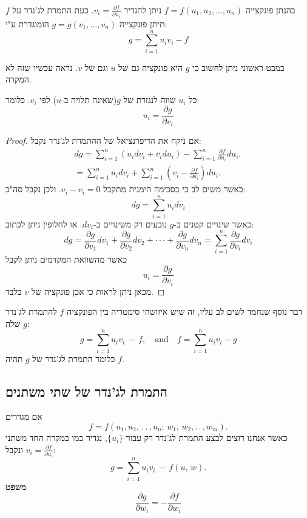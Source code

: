 \documentclass{tstextbook}
\begin{document}
\begin{definition}
בהנתן פונקצייה \(f=f\left( u_{1},u_{2},\dots,u_{n} \right)\) ניתן להגדיר \(v_{i}=\frac{\partial f}{\partial u_{i}}{}\). כעת התמרת לג'נדר על \(f\) תיתן פונקצייה \(g=g\left( v_{1},\dots,v_{n} \right)\) הומוגדרת ע"י:
$$g=\sum_{i=1}^{n}u_{i}v_{i}-f$$

\end{definition}
במבט ראשוני ניתן לחשוב כי \(g\) היא פונקציה גם של \(u\) וגם של \(v\). נראה עכשיו שזה לא המקרה.

\begin{theorem}
כל \(u_i\) שווה לנגזרת של \(g\)(שאינה תלויה ב-\(u\)) לפי \(v_{i}\). כלומר:
 $$u_{i}=\frac{\partial g}{\partial v_{i}}$$

\end{theorem}
\begin{proof}
אם ניקח את הדיפרנציאל של ההתמרת לג'נדר נקבל:
 $$\begin{array}{c}{{d g=\displaystyle\sum_{i=1}^{n}\left(u_{i}d v_{i}+v_{i}d u_{i}\right)-\sum_{i=1}^{n}\frac{\partial f}{\partial u_{i}}d u_{i},}}\\ {{=\displaystyle\sum_{i=1}^{n}u_{i}d v_{i}+\sum_{i=1}^{n}\left(v_{i}-\frac{\partial f}{\partial u_{i}}\right)d u_{i}.}}\end{array}$$
כאשר משים לב כי בסכימה הימנית מתקבל \(v_{i}-v_{i}=0\). ולכן נקבל סה"כ:
 $$d g=\sum_{i=1}^{n}u_{i}d v_{i}$$
כאשר שינויים קטנים ב-\(g\) נובעים רק משינויים ב-\(dv_{i}\). או לחלופין ניתן לכתוב:
 $$d g={\frac{\partial g}{\partial v_{1}}}d v_{1}+{\frac{\partial g}{\partial v_{2}}}d v_{2}+\cdot\cdot\cdot+{\frac{\partial g}{\partial v_{n}}}d v_{n}=\sum_{i=1}^{n}{\frac{\partial g}{\partial v_{i}}}d v_{i}$$
כאשר מהשוואת המקדמים ניתן לקבל
 $$u_{i}={\frac{\partial g}{\partial v_{i}}}$$
 מכאן ניתן לראות כי אכן פונקציה של \(v\) בלבד.

\end{proof}
\begin{remark}
דבר נוסף שנחמד לשים לב עליו, זה שיש איזושהי סימטריה בין הפונקציה \(f\) להתמרת לג'נדר שלה \(g\):
$$g=\sum_{i=1}^{n}u_{i}v_{i}\,-\,f,\quad{\mathrm{and}}\quad f=\sum_{i=1}^{n}u_{i}v_{i}-g$$
כלומר התמרת לג'נדר של \(g\) תהיה \(f\).

\end{remark}
\subsection{התמרת לג'נדר של שתי משתנים}

אם מגדרים $$f=f(u_{1},u_{2},\,.\,.\,,u_{n};\,w_{1},\,w_{2},.\,.\,,w_{m}).$$
כאשר אנחנו רוצים לבצע התמרת לג'נדר רק עבור \(\{ u_{i} \}\), נגדיר כמו במקרה החד משתני \(v_{i}=\frac{\partial f}{\partial u_{i}}\) ונקבל:
$$g=\sum_{i=1}^{n}u_{i}v_{i}\,-\,f(u,\,w).$$\textbf{משפט}$$\frac{\partial g}{\partial w_{i}}=-\frac{\partial f}{\partial w_{i}}$$
\end{document}
